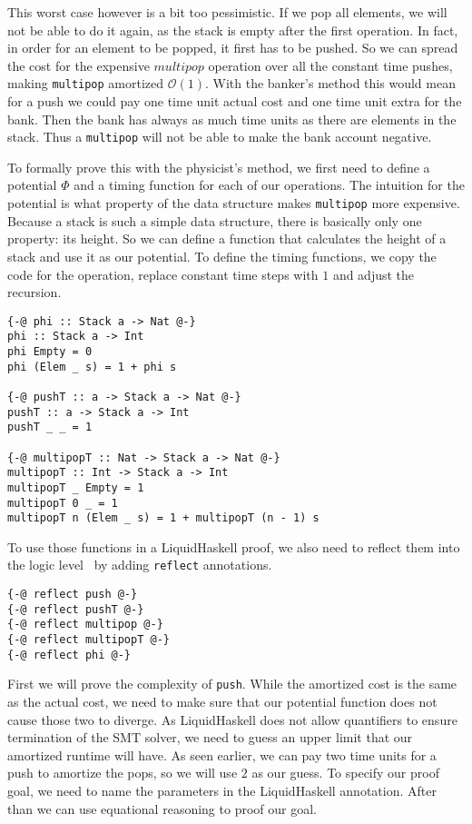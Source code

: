 \documentclass[sigplan,screen]{acmart}
\renewcommand\O[1]{$\mathcal{O}(#1)$}
\begin{document}
This worst case however is a bit too pessimistic. If we pop all elements, we will not be able to do it again, as the stack is empty after the first operation. In fact, in order for an element to be popped, it first has to be pushed. So we can spread the cost for the expensive $multipop$ operation over all the constant time pushes, making \texttt{multipop} amortized \O{1}. With the banker's method this would mean for a push we could pay one time unit actual cost and one time unit extra for the bank. Then the bank has always as much time units as there are elements in the stack. Thus a \texttt{multipop} will not be able to make the bank account negative.

To formally prove this with the physicist's method, we first need to define a potential $\Phi$ and a timing function for each of our operations. The intuition for the potential is what property of the data structure makes \texttt{multipop} more expensive. Because a stack is such a simple data structure, there is basically only one property: its height. So we can define a function that calculates the height of a stack and use it as our potential. To define the timing functions, we copy the code for the operation, replace constant time steps with $1$ and adjust the recursion.

\begin{lstlisting}
{-@ phi :: Stack a -> Nat @-}
phi :: Stack a -> Int
phi Empty = 0
phi (Elem _ s) = 1 + phi s

{-@ pushT :: a -> Stack a -> Nat @-}
pushT :: a -> Stack a -> Int
pushT _ _ = 1

{-@ multipopT :: Nat -> Stack a -> Nat @-}
multipopT :: Int -> Stack a -> Int
multipopT _ Empty = 1
multipopT 0 _ = 1
multipopT n (Elem _ s) = 1 + multipopT (n - 1) s
\end{lstlisting}

To use those functions in a LiquidHaskell proof, we also need to reflect them into the logic level~\cite{reflection} by adding \texttt{reflect} annotations.

\begin{lstlisting}
{-@ reflect push @-}
{-@ reflect pushT @-}
{-@ reflect multipop @-}
{-@ reflect multipopT @-}
{-@ reflect phi @-}
\end{lstlisting}

First we will prove the complexity of \texttt{push}. While the amortized cost is the same as the actual cost, we need to make sure that our potential function does not cause those two to diverge. As LiquidHaskell does not allow quantifiers to ensure termination of the SMT solver, we need to guess an upper limit that our amortized runtime will have. As seen earlier, we can pay two time units for a push to amortize the pops, so we will use $2$ as our guess. To specify our proof goal, we need to name the parameters in the LiquidHaskell annotation. After than we can use equational reasoning to proof our goal.
\end{document}
